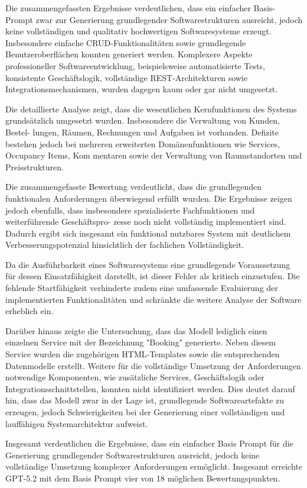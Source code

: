 \newpage
Die zusammengefassten Ergebnisse verdeutlichen, dass ein einfacher Basis-Prompt
zwar zur Generierung grundlegender Softwarestrukturen ausreicht, jedoch keine vollständigen und qualitativ hochwertigen Softwaresysteme erzeugt.
Insbesondere einfache CRUD-Funktionalitäten sowie grundlegende Benutzeroberflächen konnten generiert werden. Komplexere Aspekte professioneller Softwareentwicklung, beispielsweise automatisierte Tests, konsistente Geschäftslogik, vollständige REST-Architekturen sowie Integrationsmechanismen, wurden
dagegen kaum oder gar nicht umgesetzt.

Die detaillierte Analyse zeigt, dass die wesentlichen Kernfunktionen des Systems
grundsätzlich umgesetzt wurden. Insbesondere die Verwaltung von Kunden, Bestel-
lungen, Räumen, Rechnungen und Aufgaben ist vorhanden. Defizite bestehen jedoch
bei mehreren erweiterten Domänenfunktionen wie Services, Occupancy Items, Kom
mentaren sowie der Verwaltung von Raumstandorten und Preisstrukturen.


Die zusammengefasste Bewertung verdeutlicht, dass die grundlegenden funktionalen Anforderungen überwiegend erfüllt wurden. Die Ergebnisse zeigen jedoch ebenfalls,
dass insbesondere spezialisierte Fachfunktionen und weiterführende Geschäftspro-
zesse noch nicht vollständig implementiert sind. Dadurch ergibt sich insgesamt ein
funktional nutzbares System mit deutlichem Verbesserungspotenzial hinsichtlich der
fachlichen Vollständigkeit.

Da die Ausführbarkeit eines Softwaresystems eine grundlegende Voraussetzung für dessen Einsatzfähigkeit darstellt, ist dieser Fehler als kritisch einzustufen. Die fehlende Startfähigkeit verhinderte zudem eine umfassende Evaluierung der implementierten Funktionalitäten und schränkte die weitere Analyse der Software erheblich ein.

Darüber hinaus zeigte die Untersuchung, dass das Modell lediglich einen einzelnen Service mit der Bezeichnung "Booking" generierte. Neben diesem Service wurden die zugehörigen HTML-Templates sowie die entsprechenden Datenmodelle erstellt. Weitere für die vollständige Umsetzung der Anforderungen notwendige Komponenten, wie zusätzliche Services, Geschäftslogik oder Integrationsschnittstellen, konnten nicht identifiziert werden. Dies deutet darauf hin, dass das Modell zwar in der Lage ist, grundlegende Softwareartefakte zu erzeugen, jedoch Schwierigkeiten bei der Generierung einer vollständigen und lauffähigen Systemarchitektur aufweist.

Insgesamt verdeutlichen die Ergebnisse, dass ein einfacher Basis Prompt für die Generierung
grundlegender Softwarestrukturen ausreicht, jedoch keine vollständige Umsetzung komplexer Anforderungen ermöglicht.
Insgesamt erreichte GPT-5.2 mit dem Basis Prompt vier von 18 möglichen Bewertungspunkten.
